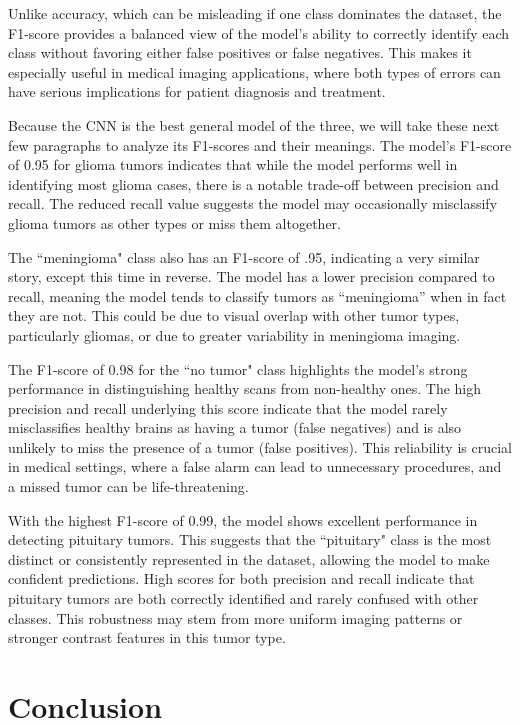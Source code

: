 \documentclass[conference]{IEEEtran}
\begin{document}
Unlike accuracy, which can be misleading if one class dominates the dataset, the F1-score provides a balanced view of the model's ability to correctly identify each class without favoring either false positives or false negatives. This makes it especially useful in medical imaging applications, where both types of errors can have serious implications for patient diagnosis and treatment.

Because the CNN is the best general model of the three, we will take these next few paragraphs to analyze its F1-scores and their meanings. The model's F1-score of 0.95 for glioma tumors indicates that while the model performs well in identifying most glioma cases, there is a notable trade-off between precision and recall. The reduced recall value suggests the model may occasionally misclassify glioma tumors as other types or miss them altogether.

The ``meningioma" class also has an F1-score of .95, indicating a very similar story, except this time in reverse. The model has a lower precision compared to recall, meaning the model tends to classify tumors as ``meningioma'' when in fact they are not. This could be due to visual overlap with other tumor types, particularly gliomas, or due to greater variability in meningioma imaging. 

The F1-score of 0.98 for the ``no tumor" class highlights the model's strong performance in distinguishing healthy scans from non-healthy ones. The high precision and recall underlying this score indicate that the model rarely misclassifies healthy brains as having a tumor (false negatives) and is also unlikely to miss the presence of a tumor (false positives). This reliability is crucial in medical settings, where a false alarm can lead to unnecessary procedures, and a missed tumor can be life-threatening.

With the highest F1-score of 0.99, the model shows excellent performance in detecting pituitary tumors. This suggests that the ``pituitary" class is the most distinct or consistently represented in the dataset, allowing the model to make confident predictions. High scores for both precision and recall indicate that pituitary tumors are both correctly identified and rarely confused with other classes. This robustness may stem from more uniform imaging patterns or stronger contrast features in this tumor type.

\section{\large Conclusion}
\end{document}
